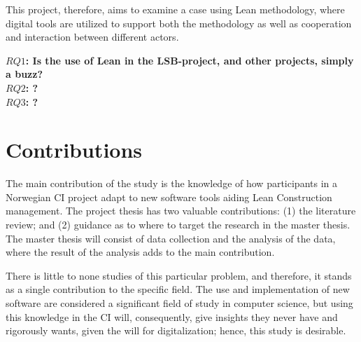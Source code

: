 This project, therefore, aims to examine a case using Lean methodology, where digital tools are utilized to support both the methodology as well as cooperation and interaction between different actors.

{\noindent \bf $RQ1$: Is the use of Lean in the LSB-project, and other projects, simply a buzz?} \\
{\bf $RQ2$: ?} \\
{\bf $RQ3$: ?} \\


\section{Contributions}



The main contribution of the study is the knowledge of how participants in a Norwegian CI project adapt to new software tools aiding Lean Construction management. The project thesis has two valuable contributions: (1) the literature review; and (2) guidance as to where to target the research in the master thesis. The master thesis will consist of data collection and the analysis of the data, where the result of the analysis adds to the main contribution. 

There is little to none studies of this particular problem, and therefore, it stands as a single contribution to the specific field. The use and implementation of new software are considered a significant field of study in computer science, but using this knowledge in the CI will, consequently, give insights they never have and rigorously wants, given the will for digitalization; hence, this study is desirable.


